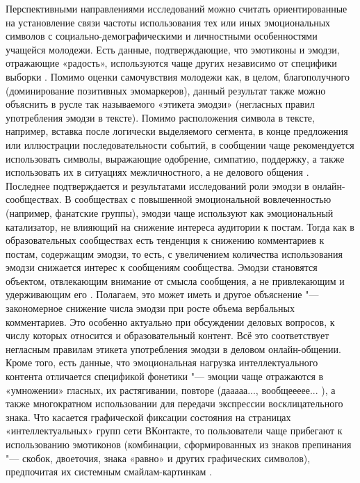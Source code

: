 Перспективными направлениями исследований можно считать ориентированные на установление связи частоты использования тех или иных эмоциональных символов с социально-демографическими и личностными особенностями учащейся молодежи. Есть данные, подтверждающие, что эмотиконы и эмодзи, отражающие «радость», используются чаще других независимо от специфики выборки \cite{BelousovObukhova}. Помимо оценки самочувствия молодежи как, в целом, благополучного (доминирование позитивных эмомаркеров), данный результат также можно объяснить в русле так называемого «этикета эмодзи» (негласных правил употребления эмодзи в тексте). Помимо расположения символа в тексте, например, вставка после логически выделяемого сегмента, в конце предложения или иллюстрации последовательности событий, в сообщении чаще рекомендуется использовать символы, выражающие одобрение, симпатию, поддержку, а также использовать их в ситуациях межличностного, а не делового общения \cite{Kosmarskaya}. Последнее подтверждается и результатами исследований роли эмодзи в онлайн-сообществах. В сообществах с повышенной эмоциональной вовлеченностью (например, фанатские группы), эмодзи чаще используют как эмоциональный катализатор, не влияющий на снижение интереса аудитории к постам. Тогда как в образовательных сообществах есть тенденция к снижению комментариев к постам, содержащим эмодзи, то есть, с увеличением количества использования эмодзи снижается интерес к сообщениям сообщества. Эмодзи становятся объектом, отвлекающим внимание от смысла сообщения, а не привлекающим и удерживающим его \cite{ShapovalovaGusarovaDobrenko}. Полагаем, это может иметь и другое объяснение "--- закономерное снижение числа эмодзи при росте объема вербальных комментариев. Это особенно актуально при обсуждении деловых вопросов, к числу которых относится и образовательный контент. Всё это соответствует негласным правилам этикета употребления эмодзи в деловом онлайн-общении. Кроме того, есть данные, что эмоциональная нагрузка интеллектуального контента отличается спецификой фонетики "--- эмоции чаще отражаются в «умножении» гласных, их растягивании, повторе (дааааа..., вообщеееее... ), а также многократном использовании для передачи экспрессии восклицательного знака. Что касается графической фиксации состояния на страницах «интеллектуальных» групп сети ВКонтакте, то пользователи чаще прибегают к использованию эмотиконов (комбинации, сформированных из знаков препинания "--- скобок, двоеточия, знака «равно» и других графических символов), предпочитая их системным смайлам-картинкам \cite{Krylova}.

